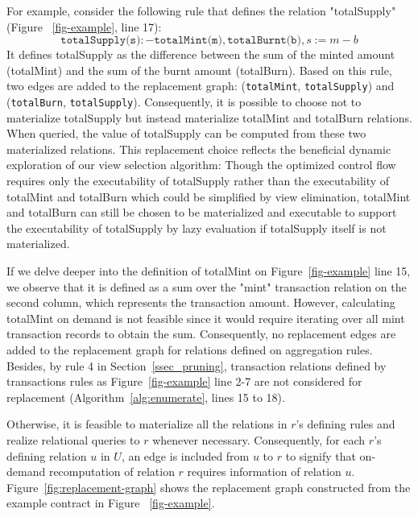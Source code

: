 For example, consider the following rule that defines the relation {\sf "totalSupply"} (Figure ~\ref{fig-example}, line 17):
\[ \texttt{totalSupply(s)}:-\texttt{totalMint(m)}, \texttt{totalBurnt(b)}, s:=m-b \]
It defines {\sf totalSupply} as the difference between the sum of the minted amount ({\sf totalMint}) 
and the sum of the burnt amount ({\sf totalBurn}). 
Based on this rule, two edges are added to the replacement graph: 
({\sf \lstinline{totalMint}, \lstinline{totalSupply}}) and ({\sf \lstinline{totalBurn}, \lstinline{totalSupply}}). 
Consequently, it is possible to choose not to materialize {\sf totalSupply} but instead materialize {\sf totalMint} and {\sf totalBurn} relations. 
When queried, the value of {\sf totalSupply} can be computed from these two materialized relations. 
This replacement choice reflects the beneficial dynamic exploration of our view selection algorithm: 
Though the optimized control flow requires only the executability of {\sf totalSupply} rather than the executability of {\sf totalMint} and {\sf totalBurn} which could be simplified by view elimination, 
{\sf totalMint} and {\sf totalBurn} can still be chosen to be materialized and executable to support the executability of {\sf totalSupply}  by lazy evaluation if {\sf totalSupply} itself is not materialized.

If we delve deeper into the definition of {\sf totalMint} on Figure~\ref{fig-example} line 15, we observe that it is defined as a sum over the {\sf "mint"} transaction relation on the second column, which represents the transaction amount. 
However, calculating {\sf totalMint} on demand is not feasible 
since it would require iterating over all {\sf mint} transaction records to obtain the sum. 
Consequently, no replacement edges are added to the replacement graph for relations defined on aggregation rules. 
Besides, by rule 4 in Section~\ref{ssec_pruning}, transaction relations defined by transactions rules as Figure~\ref{fig-example} line 2-7
are not considered for replacement (Algorithm~\ref{alg:enumerate}, lines 15 to 18).

Otherwise, it is feasible to materialize all the relations in $r$'s defining rules and realize relational queries to $r$ whenever necessary. Consequently, for each $r$'s defining relation $u$ in $U$, an edge is included from $u$ to $r$ to signify that on-demand recomputation of relation $r$ requires information of relation $u$. Figure~\ref{fig:replacement-graph} shows the replacement graph constructed from the example contract in Figure ~\ref{fig-example}.

